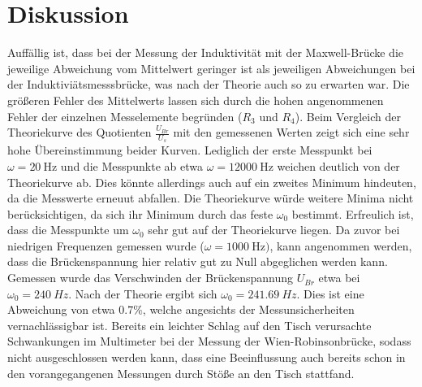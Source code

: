 \section{Diskussion}
\label{sec:Diskussion}
Auffällig ist, dass bei der Messung der Induktivität mit der Maxwell-Brücke die jeweilige Abweichung vom Mittelwert geringer ist als jeweiligen Abweichungen bei der Induktiviätsmesssbrücke, was nach der Theorie auch so zu erwarten war.
Die größeren Fehler des Mittelwerts lassen sich durch die hohen angenommenen Fehler der einzelnen Messelemente begründen ($R_3$ und $R_4$).
Beim Vergleich der Theoriekurve des Quotienten $\frac{U_{Br}}{U_s}$ mit den gemessenen Werten zeigt sich eine sehr hohe Übereinstimmung beider Kurven. Lediglich der erste Messpunkt
bei $\omega=\SI{20}{\Hz}$ und die Messpunkte ab etwa $\omega=\SI{12000}{\Hz}$ weichen deutlich von der Theoriekurve ab. Dies könnte allerdings auch auf ein zweites Minimum hindeuten, da die Messwerte erneuut abfallen. Die Theoriekurve würde weitere Minima nicht berücksichtigen, da sich ihr Minimum durch das feste $\omega_0$ bestimmt.
Erfreulich ist, dass die Messpunkte um $\omega_0$ sehr gut auf der Theoriekurve liegen.
Da zuvor bei niedrigen Frequenzen gemessen wurde ($\omega=\SI{1000}{\Hz})$, kann angenommen werden, dass die Brückenspannung hier relativ gut zu Null abgeglichen werden kann. Gemessen wurde das Verschwinden der Brückenspannung
$U_{Br}$ etwa bei $\omega_0=\SI{240}{Hz}$. Nach der Theorie ergibt sich $\omega_0=\SI{241.69}{Hz}$. Dies ist eine Abweichung von etwa $0.7\%$, welche angesichts der Messunsicherheiten vernachlässigbar ist.
Bereits ein leichter Schlag auf den Tisch verursachte Schwankungen im Multimeter bei der Messung der Wien-Robinsonbrücke, sodass nicht ausgeschlossen werden kann, dass eine Beeinflussung auch bereits schon in den vorangegangenen Messungen durch Stöße an den Tisch stattfand.
